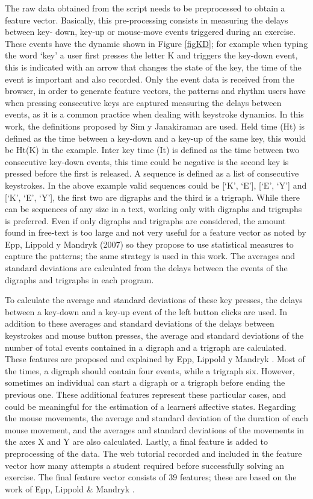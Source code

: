 \documentclass[a4paper,twoside]{article}
\begin{document}
The raw data
obtained from the script needs to be preprocessed to obtain a feature vector.
Basically, this pre-processing consists in measuring the delays between key-
down, key-up or mouse-move events triggered during an exercise. These events
have the dynamic shown in Figure \ref{figKD}; for example when typing the word ‘key’ a
user first presses the letter K and triggers the key-down event, this is
indicated with an arrow that changes the state of the key, the time of the event
is important and also recorded. Only the event data is received from the
browser, in order to generate feature vectors, the patterns and rhythm users
have when pressing consecutive keys are captured measuring the delays between
events, as it is a common practice when dealing with keystroke dynamics. In this
work, the definitions proposed by Sim y Janakiraman \cite{sim2007digraphs} are used. Held
time (Ht) is defined as the time between a key-down and a key-up of the same
key, this would be Ht(K) in the example. Inter key time (It) is defined as the
time between two consecutive key-down events, this time could be negative is the
second key is pressed before the first is released. A sequence is defined as a
list of consecutive keystrokes. In the above example valid sequences could be
[‘K’, ‘E’], [‘E’, ‘Y’] and [‘K’, ‘E’, ‘Y’], the first two are digraphs and the
third is a trigraph. While there can be sequences of any size in a text, working
only with digraphs and trigraphs is preferred. Even if only digraphs and
trigraphs are considered, the amount found in free-text is too large and not
very useful for a feature vector as noted by Epp, Lippold y Mandryk (2007) so
they propose to use statistical measures to capture the patterns; the same
strategy is used in this work. The averages and standard deviations are
calculated from the delays between the events of the digraphs and trigraphs in
each program.


To calculate the average and standard deviations of these key presses, the delays
between a key-down and a key-up event of the left button clicks are used. In
addition to these averages and standard deviations of the delays between
keystrokes and mouse button presses, the average and standard deviations of the
number of total events contained in a digraph and a trigraph are calculated.
These features are proposed and explained by Epp, Lippold y Mandryk \cite{epp2011identifying}. Most
of the times, a digraph should contain four events, while a trigraph six.
However, sometimes an individual can start a digraph or a trigraph before ending
the previous one. These additional features represent these particular cases,
and could be meaningful for the estimation of a learner\'s affective states.
Regarding the mouse movements, the average and standard deviation of the
duration of each mouse movement, and the averages and standard deviations of the
movements in the axes X and Y are also calculated. Lastly, a final feature is
added to preprocessing of the data. The web tutorial recorded  and included in the feature vector how many attempts
a student required before successfully solving an exercise. The final feature vector
consists of 39 features; these are based on the work of Epp, Lippold \& Mandryk
\cite{epp2011identifying}.
\end{document}
